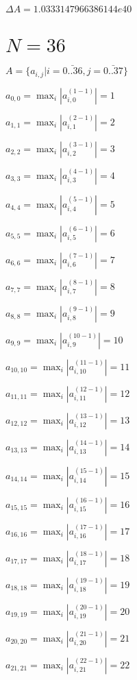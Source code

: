 \documentclass[a4paper,12pt]{article}
\begin{document}
$\Delta A = 1.0333147966386144e40$



\section{ $N = 36$ }
$A = \{ a _{ i, j } | i = \bar { 0..36 }, j = \bar { 0..37 } \}$

$a _{ 0, 0 } =  \max _i |a _{ i, 0 } ^{ (1 - 1) } | = 1$

$a _{ 1, 1 } =  \max _i |a _{ i, 1 } ^{ (2 - 1) } | = 2$

$a _{ 2, 2 } =  \max _i |a _{ i, 2 } ^{ (3 - 1) } | = 3$

$a _{ 3, 3 } =  \max _i |a _{ i, 3 } ^{ (4 - 1) } | = 4$

$a _{ 4, 4 } =  \max _i |a _{ i, 4 } ^{ (5 - 1) } | = 5$

$a _{ 5, 5 } =  \max _i |a _{ i, 5 } ^{ (6 - 1) } | = 6$

$a _{ 6, 6 } =  \max _i |a _{ i, 6 } ^{ (7 - 1) } | = 7$

$a _{ 7, 7 } =  \max _i |a _{ i, 7 } ^{ (8 - 1) } | = 8$

$a _{ 8, 8 } =  \max _i |a _{ i, 8 } ^{ (9 - 1) } | = 9$

$a _{ 9, 9 } =  \max _i |a _{ i, 9 } ^{ (10 - 1) } | = 10$

$a _{ 10, 10 } =  \max _i |a _{ i, 10 } ^{ (11 - 1) } | = 11$

$a _{ 11, 11 } =  \max _i |a _{ i, 11 } ^{ (12 - 1) } | = 12$

$a _{ 12, 12 } =  \max _i |a _{ i, 12 } ^{ (13 - 1) } | = 13$

$a _{ 13, 13 } =  \max _i |a _{ i, 13 } ^{ (14 - 1) } | = 14$

$a _{ 14, 14 } =  \max _i |a _{ i, 14 } ^{ (15 - 1) } | = 15$

$a _{ 15, 15 } =  \max _i |a _{ i, 15 } ^{ (16 - 1) } | = 16$

$a _{ 16, 16 } =  \max _i |a _{ i, 16 } ^{ (17 - 1) } | = 17$

$a _{ 17, 17 } =  \max _i |a _{ i, 17 } ^{ (18 - 1) } | = 18$

$a _{ 18, 18 } =  \max _i |a _{ i, 18 } ^{ (19 - 1) } | = 19$

$a _{ 19, 19 } =  \max _i |a _{ i, 19 } ^{ (20 - 1) } | = 20$

$a _{ 20, 20 } =  \max _i |a _{ i, 20 } ^{ (21 - 1) } | = 21$

$a _{ 21, 21 } =  \max _i |a _{ i, 21 } ^{ (22 - 1) } | = 22$
\end{document}

